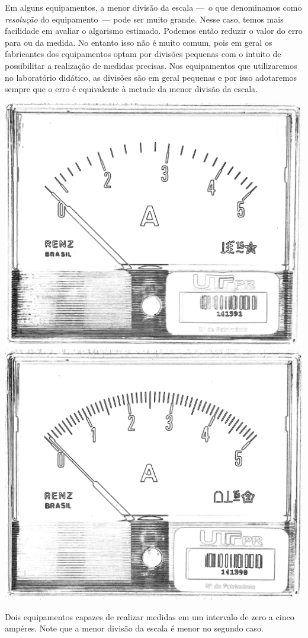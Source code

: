 \begin{description}
	Em alguns equipamentos, a menor divisão da escala ---~o que denominamos como \emph{resolução} do equipamento~--- pode ser muito grande. Nesse caso, temos mais facilidade em avaliar o algarismo estimado. Podemos então reduzir o valor do erro para  ou  da medida. No entanto isso não é muito comum, pois em geral os fabricantes dos equipamentos optam por divisões pequenas com o intuito de possibilitar a realização de medidas precisas. Nos equipamentos que utilizaremos no laboratório didático, as divisões são em geral pequenas e por isso adotaremos sempre que o erro é equivalente à metade da menor divisão da escala.

\begin{marginfigure}
    \centering
    \includegraphics[width=\linewidth]{Ilustrations/EscalaGrandeDiv.png}
    \includegraphics[width=0.97\linewidth]{Ilustrations/EscalaPeqDiv.png}
    \caption{Dois equipamentos capazes de realizar medidas em um intervalo de zero a cinco ampéres. Note que a menor divisão da escala é menor no segundo caso.}
\end{marginfigure}


\end{description}

